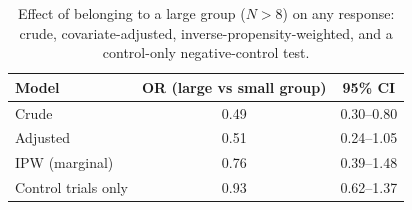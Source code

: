 \begin{table}[!ht]
\centering
\caption{Effect of belonging to a large group ($N>8$) on any response: crude, covariate-adjusted, inverse-propensity-weighted, and a control-only negative-control test.}
\label{tab:p6ipw}
\small
\begin{tabular}{lcc}
\toprule
Model & OR (large vs small group) & 95\% CI \\
\midrule
Crude & 0.49 & 0.30--0.80 \\
Adjusted & 0.51 & 0.24--1.05 \\
IPW (marginal) & 0.76 & 0.39--1.48 \\
Control trials only & 0.93 & 0.62--1.37 \\
\bottomrule
\end{tabular}
\end{table}